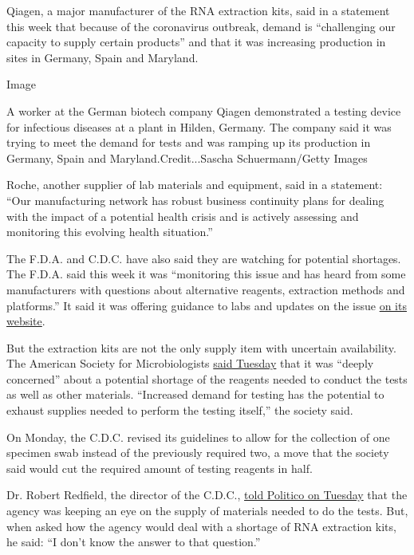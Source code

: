 Qiagen, a major manufacturer of the RNA extraction kits, said in a
statement this week that because of the coronavirus outbreak, demand is
``challenging our capacity to supply certain products'' and that it was
increasing production in sites in Germany, Spain and Maryland.

Image

A worker at the German biotech company Qiagen demonstrated a testing
device for infectious diseases at a plant in Hilden, Germany. The
company said it was trying to meet the demand for tests and was ramping
up its production in Germany, Spain and Maryland.Credit...Sascha
Schuermann/Getty Images

Roche, another supplier of lab materials and equipment, said in a
statement: ``Our manufacturing network has robust business continuity
plans for dealing with the impact of a potential health crisis and is
actively assessing and monitoring this evolving health situation.''

The F.D.A. and C.D.C. have also said they are watching for potential
shortages. The F.D.A. said this week it was ``monitoring this issue and
has heard from some manufacturers with questions about alternative
reagents, extraction methods and platforms.'' It said it was offering
guidance to labs and updates on the issue
\href{https://www.fda.gov/medical-devices/emergency-situations-medical-devices/faqs-diagnostic-testing-sars-cov-2}{on
its website}.

But the extraction kits are not the only supply item with uncertain
availability. The American Society for Microbiologists
\href{https://asm.org/Articles/Policy/2020/March/ASM-Expresses-Concern-about-Test-Reagent-Shortages}{said
Tuesday} that it was ``deeply concerned'' about a potential shortage of
the reagents needed to conduct the tests as well as other materials.
``Increased demand for testing has the potential to exhaust supplies
needed to perform the testing itself,'' the society said.

On Monday, the C.D.C. revised its guidelines to allow for the collection
of one specimen swab instead of the previously required two, a move that
the society said would cut the required amount of testing reagents in
half.

Dr. Robert Redfield, the director of the C.D.C.,
\href{https://www.politico.com/news/2020/03/10/coronavirus-testing-lab-materials-shortage-125212}{told
Politico on Tuesday} that the agency was keeping an eye on the supply of
materials needed to do the tests. But, when asked how the agency would
deal with a shortage of RNA extraction kits, he said: ``I don't know the
answer to that question.''

